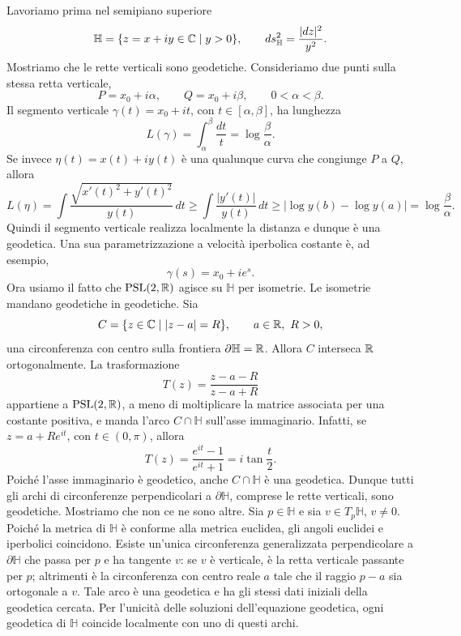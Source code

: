 \documentclass[a4paper]{article}
\begin{document}
\begin{snippetproof}{}
    Lavoriamo prima nel semipiano superiore
    \[
        \mathbb{H}=\{z=x+iy\in\mathbb{C}\mid y>0\},
        \qquad
        ds^2_{\mathbb{H}}=\frac{|dz|^2}{y^2}.
    \]
    Mostriamo che le rette verticali sono geodetiche. Consideriamo due punti sulla stessa retta verticale,
    \[
        P=x_0+i\alpha,
        \qquad
        Q=x_0+i\beta,
        \qquad
        0<\alpha<\beta.
    \]
    Il segmento verticale \(\gamma(t)=x_0+it\), con \(t\in[\alpha,\beta]\), ha lunghezza
    \[
        L(\gamma)=\int_\alpha^\beta \frac{dt}{t}
        =
        \log\frac{\beta}{\alpha}.
    \]
    Se invece \(\eta(t)=x(t)+iy(t)\) è una qualunque curva che congiunge \(P\) a \(Q\), allora
    \[
        L(\eta)
        =
        \int \frac{\sqrt{x'(t)^2+y'(t)^2}}{y(t)}\,dt
        \geq
        \int \frac{|y'(t)|}{y(t)}\,dt
        \geq
        \left|\log y(b)-\log y(a)\right|
        =
        \log\frac{\beta}{\alpha}.
    \]
    Quindi il segmento verticale realizza localmente la distanza e dunque è una geodetica. Una sua parametrizzazione a velocità iperbolica costante è, ad esempio,
    \[
        \gamma(s)=x_0+ie^s.
    \]
    Ora usiamo il fatto che \(\operatorname{PSL}(2,\mathbb{R})\) agisce su \(\mathbb{H}\) per isometrie. Le isometrie mandano geodetiche in geodetiche. Sia
    \[
        C=\{z\in\mathbb{C}\mid |z-a|=R\},
        \qquad a\in\mathbb{R},\ R>0,
    \]
    una circonferenza con centro sulla frontiera \(\partial\mathbb{H}=\mathbb{R}\). Allora \(C\) interseca \(\mathbb{R}\) ortogonalmente. La trasformazione
    \[
        T(z)=\frac{z-a-R}{z-a+R}
    \]
    appartiene a \(\operatorname{PSL}(2,\mathbb{R})\), a meno di moltiplicare la matrice associata per una costante positiva, e manda l'arco \(C\cap\mathbb{H}\) sull'asse immaginario. Infatti, se \(z=a+Re^{it}\), con \(t\in(0,\pi)\), allora
    \[
        T(z)=\frac{e^{it}-1}{e^{it}+1}
        =
        i\tan\frac{t}{2}.
    \]
    Poiché l'asse immaginario è geodetico, anche \(C\cap\mathbb{H}\) è una geodetica. Dunque tutti gli archi di circonferenze perpendicolari a \(\partial\mathbb{H}\), comprese le rette verticali, sono geodetiche.
    Mostriamo che non ce ne sono altre. Sia \(p\in\mathbb{H}\) e sia \(v\in T_p\mathbb{H}\), \(v\neq0\). Poiché la metrica di \(\mathbb{H}\) è conforme alla metrica euclidea, gli angoli euclidei e iperbolici coincidono. Esiste un'unica circonferenza generalizzata perpendicolare a \(\partial\mathbb{H}\) che passa per \(p\) e ha tangente \(v\): se \(v\) è verticale, è la retta verticale passante per \(p\); altrimenti è la circonferenza con centro reale \(a\) tale che il raggio \(p-a\) sia ortogonale a \(v\). Tale arco è una geodetica e ha gli stessi dati iniziali della geodetica cercata. Per l'unicità delle soluzioni dell'equazione geodetica, ogni geodetica di \(\mathbb{H}\) coincide localmente con uno di questi archi.

\end{snippetproof}
\end{document}
